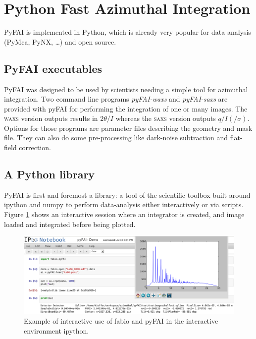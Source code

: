 \documentclass[a4paper]{jpconf}
\begin{document}
\section{Python Fast Azimuthal Integration}
PyFAI is implemented in Python, which is already very popular for data
analysis (PyMca\cite{pymca}, PyNX\cite{pynx}, \ldots) and open source.

\subsection{PyFAI executables}
PyFAI was designed to be used by scientists needing a simple tool for azimuthal
integration. Two command line programs \textit{pyFAI-waxs} and
\textit{pyFAI-saxs} are provided with pyFAI for performing the
integration of one or many images. The \textsc{waxs} version outputs results in
$2\theta /I$  whereas the \textsc{saxs} version outputs $q/I(/\sigma )$.
Options for those programs are parameter files describing the geometry and mask file. They can
also do some  pre-processing like dark-noise subtraction and flat-field correction.

\subsection{A Python library}
PyFAI is first and foremost a library: a tool of the scientific
toolbox built around ipython\cite{ipython} and numpy\cite{numpy} to
perform data-analysis either interactively or via scripts.
Figure \ref{notebook} shows an interactive session where an integrator is
created, and image loaded and integrated before being plotted.

\begin{figure}[h]
\begin{center}
\includegraphics[width=15cm]{img/notebook-l.eps}
\caption{\label{notebook} Example of interactive use of fabio and pyFAI in the
interactive environment ipython.}
\end{center}
\end{figure}
\end{document}
